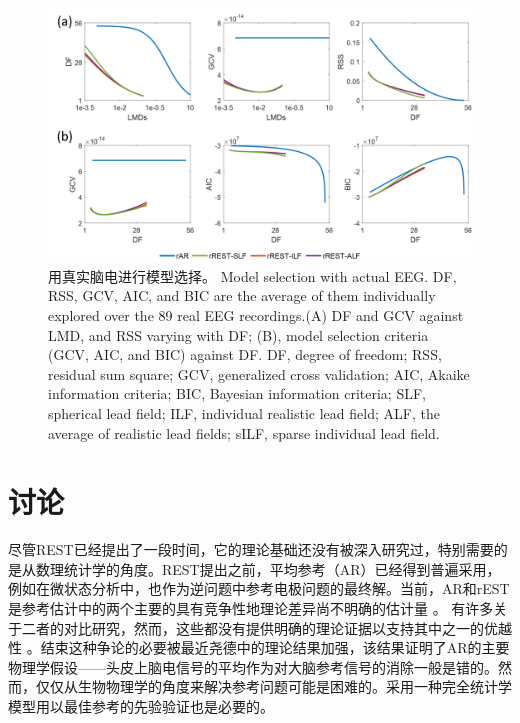 \begin{figure}[!ht]
	\centering
	\includegraphics[width=15cm]{pic/Frontier/figure8.png}
	\caption{用真实脑电进行模型选择。 Model selection with actual EEG. DF, RSS, GCV, AIC, and BIC are the average of them individually explored over the 89 real EEG recordings.(A) DF and GCV against LMD, and RSS varying with DF; (B), model selection criteria (GCV, AIC, and BIC) against DF. DF, degree of freedom; RSS, residual sum square; GCV, generalized cross validation; AIC, Akaike information criteria; BIC, Bayesian information criteria; SLF, spherical lead field; ILF, individual realistic lead field; ALF, the average of realistic lead fields; sILF, sparse individual lead field.}
	\label{3.8}
\end{figure}

\section{讨论}
尽管REST已经提出了一段时间，它的理论基础还没有被深入研究过，特别需要的是从数理统计学的角度。REST提出之前，平均参考（AR）已经得到普遍采用，例如在微状态分析中，也作为逆问题中参考电极问题的最终解。当前，AR和rEST是参考估计中的两个主要的具有竞争性地理论差异尚不明确的估计量 。 有许多关于二者的对比研究，然而，这些都没有提供明确的理论证据以支持其中之一的优越性
。结束这种争论的必要被最近尧德中的理论结果加强，该结果证明了AR的主要物理学假设——头皮上脑电信号的平均作为对大脑参考信号的消除一般是错的。然而，仅仅从生物物理学的角度来解决参考问题可能是困难的。采用一种完全统计学模型用以最佳参考的先验验证也是必要的。


